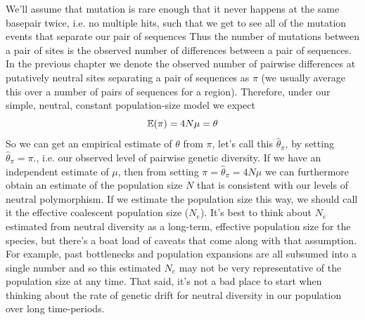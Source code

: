 %
We'll assume that mutation is rare enough that it never happens at the same basepair twice, i.e. no multiple hits, such that we get to see all of the mutation events that separate our pair
of sequences  Thus the number of
mutations between a pair of sites is the observed number of
differences between a pair of sequences. In the previous chapter we denote the observed number of pairwise differences at putatively neutral
sites separating a pair of sequences as $\pi$ (we usually average this over a
number of pairs of sequences for a region). Therefore, under our simple, neutral, constant population-size model we expect
\begin{equation}
\mathbb{E}(\pi) = 4 N \mu = \theta
\end{equation}
So we can get an empirical estimate of $\theta$ from
$\pi$, let's call this $\widehat{\theta}_{\pi}$, by setting $\widehat{\theta}_{\pi}=\pi$., i.e. our observed level of pairwise genetic diversity.  If we
have an independent estimate of $\mu$, then from setting $\pi =\widehat{\theta}_{\pi} = 4N\mu$ we can furthermore obtain an estimate of the population
size $N$ that is consistent with our levels of neutral polymorphism. If we estimate the population size this way, we should call it the effective coalescent population size ($N_e$). It's best to think about $N_{e}$ estimated from neutral diversity as a long-term, effective population size for the species, but there's a boat load of caveats that come along with that assumption. For example, past bottlenecks and population expansions are all subsumed into a single number and so this estimated $N_{e}$ may not be very representative of the population size at any time. That said, it's not a bad place to start when thinking about the rate of genetic drift for neutral diversity in our population over long time-periods.  

